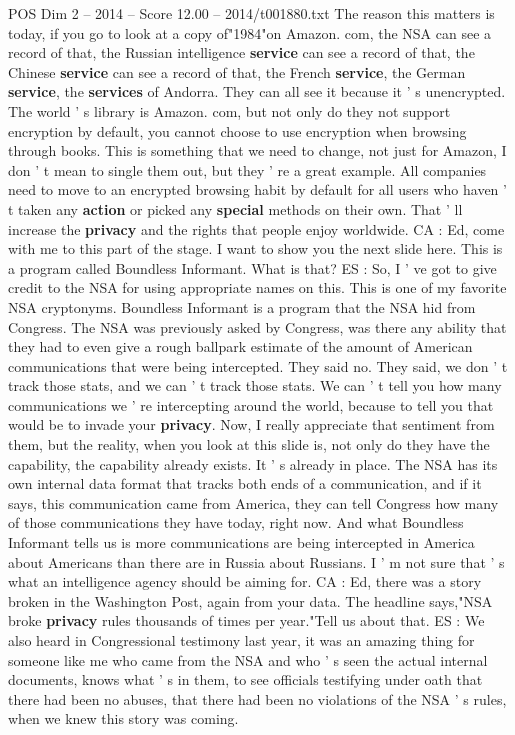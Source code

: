 \begin{textsample}{POS Dim 2 – 2014 – Score 12.00 – 2014/t001880.txt}
The reason this matters is today, if you go to look at a copy of"1984"on Amazon. com, the NSA can see a record of that, the Russian intelligence \textbf{service} can see a record of that, the Chinese \textbf{service} can see a record of that, the French \textbf{service}, the German \textbf{service}, the \textbf{services} of Andorra.
They can all see it because it ' s unencrypted.
The world ' s library is Amazon. com, but not only do they not support encryption by default, you cannot choose to use encryption when browsing through books.
This is something that we need to change, not just for Amazon, I don ' t mean to single them out, but they ' re a great example.
All companies need to move to an encrypted browsing habit by default for all users who haven ' t taken any \textbf{action} or picked any \textbf{special} methods on their own.
That ' ll increase the \textbf{privacy} and the rights that people enjoy worldwide.
CA : Ed, come with me to this part of the stage.
I want to show you the next slide here.
This is a program called Boundless Informant.
What is that?
ES : So, I ' ve got to give credit to the NSA for using appropriate names on this.
This is one of my favorite NSA cryptonyms.
Boundless Informant is a program that the NSA hid from Congress.
The NSA was previously asked by Congress, was there any ability that they had to even give a rough ballpark estimate of the amount of American communications that were being intercepted.
They said no.
They said, we don ' t track those stats, and we can ' t track those stats.
We can ' t tell you how many communications we ' re intercepting around the world, because to tell you that would be to invade your \textbf{privacy}.
Now, I really appreciate that sentiment from them, but the reality, when you look at this slide is, not only do they have the capability, the capability already exists.
It ' s already in place.
The NSA has its own internal data format that tracks both ends of a communication, and if it says, this communication came from America, they can tell Congress how many of those communications they have today, right now.
And what Boundless Informant tells us is more communications are being intercepted in America about Americans than there are in Russia about Russians.
I ' m not sure that ' s what an intelligence agency should be aiming for.
CA : Ed, there was a story broken in the Washington Post, again from your data.
The headline says,"NSA broke \textbf{privacy} rules thousands of times per year."Tell us about that.
ES : We also heard in Congressional testimony last year, it was an amazing thing for someone like me who came from the NSA and who ' s seen the actual internal documents, knows what ' s in them, to see officials testifying under oath that there had been no abuses, that there had been no violations of the NSA ' s rules, when we knew this story was coming.

\end{textsample}

